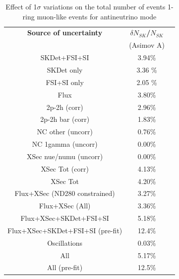 \begin{table}[htb]
\centering
\begin{tabular}{| c | c | c |}
\hline
  {\bf Source of uncertainty}    & \multicolumn{1}{c|}{{\bf ${\delta}N_{SK}$/$N_{SK}$}}\\
                                 & \multicolumn{1}{c|}{(Asimov A)}\\

\hline
\hline  
SKDet+FSI+SI                   & 3.94\%                        \\
SKDet only                   & 3.36 \%                        \\
FSI+SI only                   & 2.05 \%                        \\
\hline
  Flux                           & 3.80\%                        \\
\hline
\hline
  2p-2h (corr)                     & 2.96\%                        \\
  2p-2h bar (corr)                  & 1.83\%                        \\
  NC other (uncorr)              & 0.76\%                        \\
  NC 1gamma (uncorr)             & 0.00\%                        \\
  XSec nue/numu (uncorr)                 & 0.00\%                        \\
\hline
  XSec Tot (corr)                  & 4.13\%                        \\
  XSec Tot                       & 4.20\%                        \\
\hline
\hline
  Flux+XSec (ND280 constrained)                      & 3.27\%                        \\
  Flux+XSec  (All)                    & 3.36\%                        \\
\hline
  Flux+XSec+SKDet+FSI+SI         & 5.18\%                        \\
  Flux+XSec+SKDet+FSI+SI (pre-fit)         & 12.4\%                        \\
\hline
\hline
  Oscillations                   & 0.03\%                        \\
\hline
\hline
  All                            & 5.17\%                        \\
      All (pre-fit) 		& 12.5\%				\\
\hline
\hline
\end{tabular} 
\caption{
 Effect of 1$\sigma$ variations on the total number of events 1-ring muon-like events for antineutrino mode
}
\end{table}
